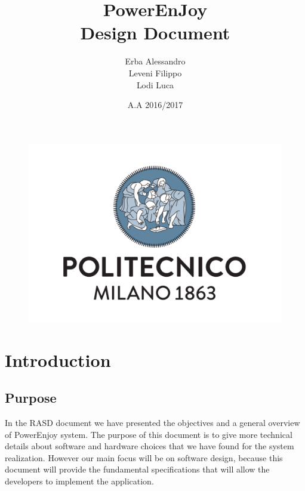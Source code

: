 \documentclass[english]{article}
\begin{document}
	\begin{figure}
		\centering
		\includegraphics[scale=0.5]{logo.pdf} 
	\end{figure}


	\title{PowerEnJoy\\
	Design Document\\
	}

	\date{A.A 2016/2017}
	
	\author{Erba Alessandro\\
	 Leveni Filippo\\
	 Lodi Luca}
	
	\maketitle
	\pagebreak{}

\tableofcontents{} \pagebreak{}
\section{Introduction}
	\subsection{Purpose}
		In the RASD document we have presented the objectives and a general overview of PowerEnjoy system.
		The purpose of this document is to give more technical details about software and hardware choices that we have found for the system realization.
		However our main focus will be on software design, because this document will provide the fundamental specifications that will allow the developers to implement the application.
\end{document}
